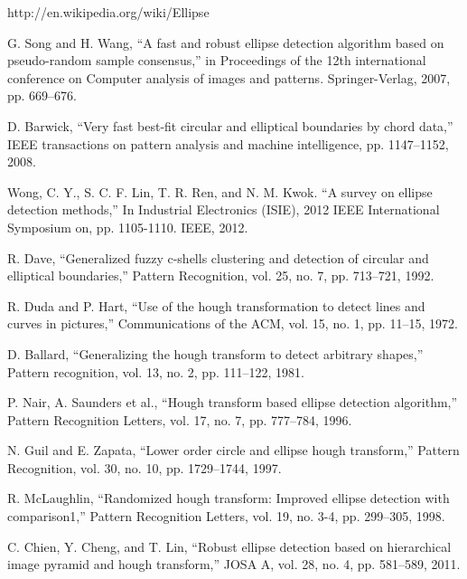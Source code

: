 \documentclass[12pt,a4paper]{article}
\numberwithin{equation}{section}
\numberwithin{figure}{section}
\theoremstyle{definition}
\theoremstyle{theorem}
\theoremstyle{definition}
\begin{document}
\newpage

\small
\begin{thebibliography}{99}

\begin{LTRitems}

\resetlatinfont

http://en.wikipedia.org/wiki/Ellipse

G. Song and H. Wang, “A fast and robust ellipse detection algorithm based on pseudo-random sample consensus,” in Proceedings of the 12th international conference on Computer analysis of images and patterns. Springer-Verlag, 2007, pp. 669–676.

D. Barwick, “Very fast best-fit circular and elliptical boundaries by chord data,” IEEE transactions on pattern analysis and machine intelligence, pp. 1147–1152, 2008.

Wong, C. Y., S. C. F. Lin, T. R. Ren, and N. M. Kwok. “A survey on ellipse detection methods,” In Industrial Electronics (ISIE), 2012 IEEE International Symposium on, pp. 1105-1110. IEEE, 2012.


R. Dave, “Generalized fuzzy c-shells clustering and detection of circular and elliptical boundaries,” Pattern Recognition, vol. 25, no. 7, pp. 713–721, 1992.

R. Duda and P. Hart, “Use of the hough transformation to detect lines and curves in pictures,” Communications of the ACM, vol. 15, no. 1, pp. 11–15, 1972.

D. Ballard, “Generalizing the hough transform to detect arbitrary shapes,” Pattern recognition, vol. 13, no. 2, pp. 111–122, 1981.

P. Nair, A. Saunders et al., “Hough transform based ellipse detection algorithm,” Pattern Recognition Letters, vol. 17, no. 7, pp. 777–784, 1996.

N. Guil and E. Zapata, “Lower order circle and ellipse hough transform,” Pattern Recognition, vol. 30, no. 10, pp. 1729–1744, 1997.

R. McLaughlin, “Randomized hough transform: Improved ellipse detection with comparison1,” Pattern Recognition Letters, vol. 19, no. 3-4, pp. 299–305, 1998.

C. Chien, Y. Cheng, and T. Lin, “Robust ellipse detection based on hierarchical image pyramid and hough transform,” JOSA A, vol. 28, no. 4, pp. 581–589, 2011.


\end{LTRitems}
\end{thebibliography}
\end{document}
